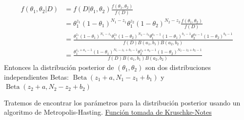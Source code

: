 \documentclass[
  12pt,
]{book}
\theoremstyle{definition}
\theoremstyle{definition}
\theoremstyle{definition}
\theoremstyle{remark}
\begin{document}
\begin{align*}
f\left(\theta_{1}, \theta_{2} | D\right) 
&=f\left(D | \theta_{1}, \theta_{2}\right) \frac{f\left(\theta_{1}, \theta_{2}\right)}{f(D)} \\
&=\theta_{1}^{z_{1}}\left(1-\theta_{1}\right)^{N_{1}-z_{1}} \theta_{1}^{z_{2}}\left(1-\theta_{2}\right)^{N_{2}-z_{2}} \frac{f\left(\theta_{1}, \theta_{2}\right)}{f(D)}  \\
&=\frac{\theta_{1}^{z_{1}}\left(1-\theta_{1}\right)^{N_{1}-z_{1}} \theta_{1}^{z_{2}}\left(1-\theta_{2}\right)^{N_{2}-z_{2}} \theta_{1}^{a_{1}-1}\left(1-\theta_{1}\right)^{b_{1}-1} \theta_{2}^{a_{2}-1}\left(1-\theta_{2}\right)^{b_{2}-1}}{f(D) B\left(a_{1}, b_{1}\right) B\left(a_{2}, b_{2}\right)} \\
&=\frac{\theta_{1}^{z_{1}+a_{1}-1}\left(1-\theta_{1}\right)^{N_{1}-z_{1}+b_{1}-1} \theta_{2}^{z_{2}+a_{2}-1}\left(1-\theta_{2}\right)^{N_{2}-z_{2}+b_{2}-1}}{f(D) B\left(a_{1}, b_{1}\right) B\left(a_{2}, b_{2}\right)}
\end{align*}
Entonces la distribución posterior de \(\left(\theta_{1}, \theta_{2}\right)\) son dos distribuciones independientes Betas:
\(\operatorname{Beta}\left(z_{1}+a, N_{1}-z_{1}+b_{1}\right)\) y \(\operatorname{Beta}\left(z_{2}+a, N_{2}-z_{2}+b_{2}\right)\)

Tratemos de encontrar los parámetros para la distribución posterior usando un algoritmo de Metropolis-Hasting. \href{https://rpruim.github.io/Kruschke-Notes/markov-chain-monte-carlo-mcmc.html\#metropolis}{Función tomada de Kruschke-Notes}
\end{document}
